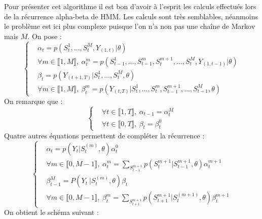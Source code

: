 \documentclass[10pt,a4paper]{article}
\newcommand{\hmm}{\textsc{HMM}}
\begin{document}
Pour présenter cet algorithme il est bon d'avoir à l'esprit les calculs 
effectués lors de la récurrence alpha-beta de \hmm. Les calculs sont très 
semblables, néanmoins le problème est ici plus complexe puisque l'on n'a non pas
une chaîne de Markov mais $M$. On pose :
\begin{equation}
\left\lbrace
\begin{aligned}
&\alpha_t=p(S_t^{1},\dots,S_t^{M},Y_{(1,t)}\vert \theta) \\
&\forall m \in \llbracket 1,M \rrbracket, \ \alpha_t^m=p(S_{t-1}^1, \dots, 
S_{t-1}^m,S_{t}^{m+1}, \dots, S_{t}^M, Y_{(1,t-1)} \vert \theta) \\
&\beta_t=p(Y_{(t+1,T)} \vert S_t^1, \dots,S_t^M, \theta) \\
&\forall m \in \llbracket 1,M \rrbracket, \ \beta_t^m=p(Y_{(t,T)} \vert S_t^1, 
\dots, S_t^m,S_{t-1}^{m+1}, \dots, S_{t-1}^M, \theta)
\end{aligned}
\right.
\end{equation}
On remarque que :
\begin{equation}
\left\lbrace 
\begin{aligned}
&\forall t \in \llbracket 1,T \rrbracket, \ \alpha_{t-1}=\alpha_{t}^M  \\
&\forall t \in \llbracket 0,T \rrbracket, \ \beta_{t}=\beta_{t}^0
\end{aligned}
\right.
\end{equation}
Quatre autres équations permettent de compléter la récurrence :
\begin{equation}
\left\lbrace
\begin{aligned}
&\alpha_t=p(Y_t \vert S_t^{(m)}, \theta)\alpha_t^0 \\
&\forall m \in \llbracket 0,M-1 \rrbracket, \ 
\alpha_t^m=\underset{S_{t-1}^{m+1}}{\sum}p(S_t^{m+1} \vert S_{t-1}^{m+1}, 
\theta) \alpha_t^{m+1} \\
&\beta_{t-1}^M=P( Y_t \ \vert S_t^{(m)},\theta) \beta_t \\
&\forall m \in \llbracket 0, M-1 \rrbracket, \ 
\beta_t^{m}=\underset{S_{t+1}^{m+1}}{\sum}p(S_{t+1}^{m+1} \vert S_{t}^{(m+1)}, 
\theta) \beta_{t}^{m+1}
\end{aligned}
\right.
\end{equation}
On obtient le schéma suivant :
\end{document}

